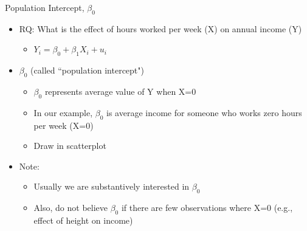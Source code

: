 \begin{comment}

\begin{frame}{Population regression coefficient, $\beta_{1}$}
	\begin{itemize}
	\item Other important stuff
		\begin{itemize}
		\vspace{5mm}
		\item If $\beta_{1}$ -the relationship between X and Y- is linear, then the average change in Y for a one-unit increase in X is the same, no matter what the starting value of X
			\begin{itemize}
			\item Draw in scatterplot
			\end{itemize}
		\vspace{5mm}
		\item $\beta_{1}$ is a *population parameter*; we don't know it. We estimate $\beta_{1}$ using sample data
		\vspace{5mm}
		\item $\beta_{1}$ measures the *average* effect on Y for one-unit increase in X; effect on an individual person may be different than this average effect
		\end{itemize}
	\end{itemize}
\end{frame}

\end{comment}

\begin{frame}{Population Intercept, $\beta_{0}$}
	\begin{itemize}
	\item RQ: What is the effect of hours worked per week (X) on annual income (Y) 
		\begin{itemize}
		\item $Y_{i} = \beta_{0} + \beta_{1}X_{i} + u_{i}$
		\end{itemize}
	\item $\beta_{0}$ (called ``population intercept")
		\begin{itemize}
		\item $\beta_{0}$ represents average value of Y when X=0
		\item In our example, $\beta_{0}$ is average income for someone who works zero hours per week (X=0)
		\item Draw in scatterplot
		\end{itemize}
	\item Note:
		\begin{itemize}
		\item Usually we are substantively interested in $\beta_{0}$
		\item Also, do not believe $\beta_{0}$ if there are few observations where X=0 (e.g., effect of height on income) 
		\end{itemize}
	\end{itemize}
\end{frame} 

